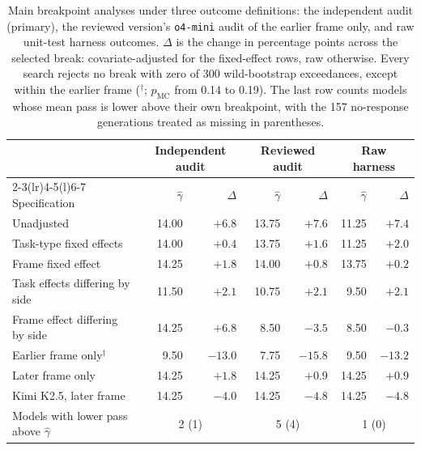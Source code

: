 \documentclass{article}
\begin{document}
\begin{table}[h]
\centering
\caption{Main breakpoint analyses under three outcome definitions: the independent audit (primary), the reviewed version's \texttt{o4-mini} audit of the earlier frame only, and raw unit-test harness outcomes. $\Delta$ is the change in percentage points across the selected break: covariate-adjusted for the fixed-effect rows, raw otherwise. Every search rejects no break with zero of 300 wild-bootstrap exceedances, except within the earlier frame ($^\dagger$; $p_{\mathrm{MC}}$ from 0.14 to 0.19). The last row counts models whose mean pass is lower above their own breakpoint, with the 157 no-response generations treated as missing in parentheses.}
\label{tab:outcome-sensitivity}
\small
\begin{tabular}{@{}lrrrrrr@{}}
\toprule
& \multicolumn{2}{c}{Independent audit} & \multicolumn{2}{c}{Reviewed audit} & \multicolumn{2}{c}{Raw harness} \\
\cmidrule(lr){2-3}\cmidrule(lr){4-5}\cmidrule(l){6-7}
Specification & $\hat{\gamma}$ & $\Delta$ & $\hat{\gamma}$ & $\Delta$ & $\hat{\gamma}$ & $\Delta$ \\
\midrule
Unadjusted & 14.00 & $+6.8$ & 13.75 & $+7.6$ & 11.25 & $+7.4$ \\
Task-type fixed effects & 14.00 & $+0.4$ & 13.75 & $+1.6$ & 11.25 & $+2.0$ \\
Frame fixed effect & 14.25 & $+1.8$ & 14.00 & $+0.8$ & 13.75 & $+0.2$ \\
Task effects differing by side & 11.50 & $+2.1$ & 10.75 & $+2.1$ & 9.50 & $+2.1$ \\
Frame effect differing by side & 14.25 & $+6.8$ & 8.50 & $-3.5$ & 8.50 & $-0.3$ \\
Earlier frame only$^\dagger$ & 9.50 & $-13.0$ & 7.75 & $-15.8$ & 9.50 & $-13.2$ \\
Later frame only & 14.25 & $+1.8$ & 14.25 & $+0.9$ & 14.25 & $+0.9$ \\
Kimi K2.5, later frame & 14.25 & $-4.0$ & 14.25 & $-4.8$ & 14.25 & $-4.8$ \\
\midrule
Models with lower pass above $\hat{\gamma}$ & \multicolumn{2}{c}{2 (1)} & \multicolumn{2}{c}{5 (4)} & \multicolumn{2}{c}{1 (0)} \\
\bottomrule
\end{tabular}
\end{table}
\end{document}
